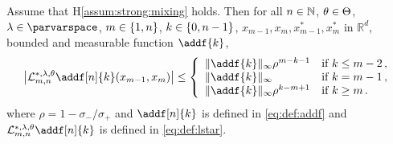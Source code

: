\documentclass{article}
\begin{document}
\begin{lemma} \label{lem:geo:bound}
Assume that H\ref{assum:strong:mixing} holds. Then for all $n \in \mathbb{N}$, $\theta\in\Theta$, $\parvar\in\parvarspace$, $m \in \{ 1, n \}$, $k \in \{ 0, n - 1 \}$, $x_{m-1},x_m, x^*_{m-1},x^*_m$ in $\mathbb{R}^d$, bounded and measurable function $\addf{k}$, %
$$
\left|\mathcal{L}^{*,\parvar,\parvec}_{m, n}\addf[n]{k}(x_{m-1},x_m) \right| \leq 
\left\{
    \begin{array}{ll}
        \| \addf{k} \|_\infty \rho^{m - k - 1}& \mbox{if } k\leq m-2\,, \\
        \| \addf{k} \|_\infty & \mbox{if } k = m-1\,, \\
         \| \addf{k} \|_\infty \rho^{k-m+1}& \mbox{if } k\geq m\,.
    \end{array}
\right.
$$
where $\rho = 1 - \sigma_-/\sigma_+$ and $\addf[n]{k}$ is defined in \eqref{eq:def:addf} and $\mathcal{L}^{*,\parvar,\parvec}_{m, n}\addf[n]{k}$ is defined in \eqref{eq:def:lstar}.
\end{lemma}
\end{document}
